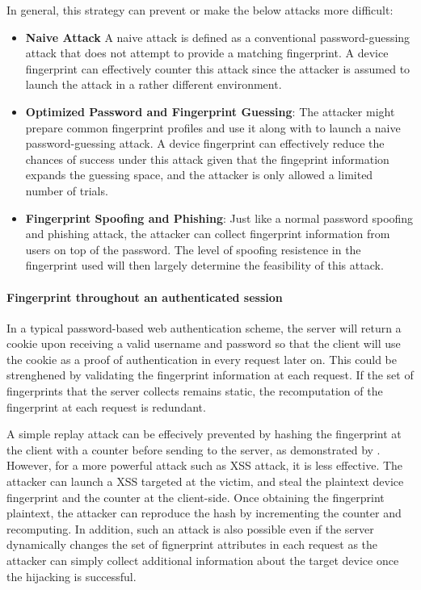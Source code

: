 \documentclass{acm_proc_article-sp}
\begin{document}
In general, this strategy can prevent or make the below attacks more difficult: 
\begin{itemize}
    \item \textbf{Naive Attack} A naive attack is defined as a conventional password-guessing attack that does not attempt to provide a matching fingerprint. A device fingerprint can effectively counter this attack since the attacker is assumed to launch the attack in a rather different environment. 
    \item \textbf{Optimized Password and Fingerprint Guessing}: The attacker might prepare common fingerprint profiles and use it along with to launch a naive password-guessing attack. A device fingerprint can effectively reduce the chances of success under this attack given that the fingeprint information expands the guessing space, and the attacker is only allowed a limited number of trials. 
    \item \textbf{Fingerprint Spoofing and Phishing}: Just like a normal password spoofing and phishing attack, the attacker can collect fingerprint information from users on top of the password. The level of spoofing resistence in the fingerprint used will then largely determine the feasibility of this attack. 
\end{itemize}

\paragraph{Fingerprint throughout an authenticated session}
In a typical password-based web authentication scheme, the server will return a cookie upon receiving a valid username and password so that the client will use the cookie as a proof of authentication in every request later on. This could be strenghened by validating the fingerprint information at each request. If the set of fingerprints that the server collects remains static, the recomputation of the fingerprint at each request is redundant.

A simple replay attack can be effecively prevented by hashing the fingerprint at the client with a counter before sending to the server, as demonstrated by \cite{preu:smart}. However, for a more powerful attack such as XSS attack, it is less effective. The attacker can launch a XSS targeted at the victim, and steal the plaintext device fingerprint and the counter at the client-side. Once obtaining the fingerprint plaintext, the attacker can reproduce the hash by incrementing the counter
and recomputing. In addition, such an attack is also possible even if the server dynamically changes the set of fignerprint attributes in each request \cite{unger:shpf} as the attacker can simply collect additional information about the target device once the hijacking is successful.
\end{document}

